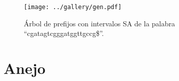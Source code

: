\documentclass{article}
\newcommand{\C}{C }
\newcommand{\R}{R }
\newcommand{\python}{Python }
\begin{document}
\begin{figure}[h]
\centering
\texttt{[image: ../gallery/gen.pdf]}
\caption{Árbol de prefijos con intervalos SA de la palabra ``cgatagtcgggatggttgccg\$''.}
\label{fig:arbol4}
\end{figure}
\clearpage
\section{Anejo}







\phantom{}
\vfill

\vfill



\end{document}
